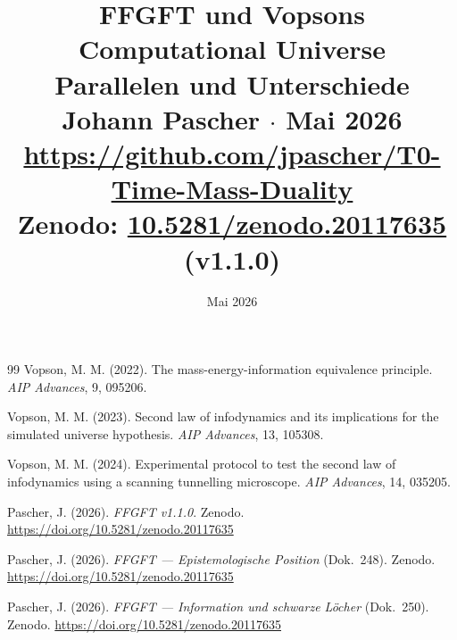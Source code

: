 \documentclass[11pt]{report}
\title{%
    {\LARGE\bfseries\color{t0blue}
     FFGFT und Vopsons Computational Universe}\\[0.5em]
    {\large Parallelen und Unterschiede}\\[1em]
    {\normalsize Johann Pascher \quad $\cdot$ \quad Mai 2026}\\[0.3em]
    {\small \url{https://github.com/jpascher/T0-Time-Mass-Duality}}\\[0.3em]
    {\small Zenodo: \href{https://doi.org/10.5281/zenodo.20117635}{10.5281/zenodo.20117635} (v1.1.0)}
}
\date{Mai 2026}
\begin{document}
    \maketitle
    

    \begin{thebibliography}{99}
    Vopson, M. M. (2022). The mass-energy-information equivalence principle.
    \emph{AIP Advances}, 9, 095206.

    Vopson, M. M. (2023). Second law of infodynamics and its implications for the
    simulated universe hypothesis. \emph{AIP Advances}, 13, 105308.

    Vopson, M. M. (2024). Experimental protocol to test the second law of
    infodynamics using a scanning tunnelling microscope. \emph{AIP Advances}, 14, 035205.

    Pascher, J. (2026). \emph{FFGFT v1.1.0}. Zenodo.
    \url{https://doi.org/10.5281/zenodo.20117635}

    Pascher, J. (2026). \emph{FFGFT --- Epistemologische Position} (Dok.~248).
    Zenodo. \url{https://doi.org/10.5281/zenodo.20117635}

    Pascher, J. (2026). \emph{FFGFT --- Information und schwarze Löcher} (Dok.~250).
    Zenodo. \url{https://doi.org/10.5281/zenodo.20117635}
    \end{thebibliography}
\end{document}
